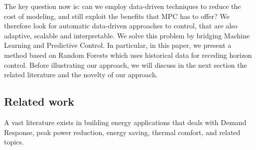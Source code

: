 \textcolor[rgb]{0,0,1}{The key question now is: can we employ data-driven techniques to reduce the cost of modeling, and still exploit the benefits that MPC has to offer?
We therefore look for automatic data-driven approaches to control, that are also adaptive, scalable and interpretable.
We solve this problem by bridging Machine Learning and Predictive Control. In particular, in this paper, we present a method based on Random Forests which uses historical data for receding horizon control. Before illustrating our approach, we will discuss in the next section the related literature and the novelty of our approach.}







\textcolor[rgb]{0,0,1}{
\subsection{Related work}
A vast literature exists in building energy applications that deals with Demand Response, peak power reduction, energy saving, thermal comfort, and related topics.
}


